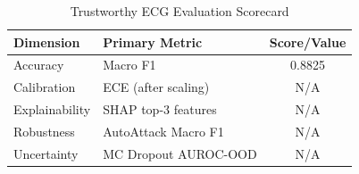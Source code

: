 \begin{table}[ht]
\centering
\caption{Trustworthy ECG Evaluation Scorecard}
\begin{tabular}{llc}
\hline
Dimension & Primary Metric & Score/Value \\
\hline
Accuracy & Macro F1 & 0.8825 \\
Calibration & ECE (after scaling) & N/A \\
Explainability & SHAP top-3 features & N/A \\
Robustness & AutoAttack Macro F1 & N/A \\
Uncertainty & MC Dropout AUROC-OOD & N/A \\
\hline
\end{tabular}
\end{table}
